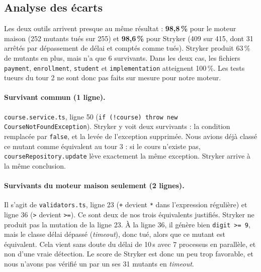 \documentclass[12pt,a4paper]{article}
\begin{document}
\subsection{Analyse des écarts}
Les deux outils arrivent presque au même résultat : \textbf{98{,}8\,\%} pour le moteur maison (252 mutants tués sur 255) et \textbf{98{,}6\,\%} pour Stryker (409 sur 415, dont 31 arrêtés par dépassement de délai et comptés comme tués). Stryker produit 63\,\% de mutants en plus, mais n'a que 6 survivants. Dans les deux cas, les fichiers \texttt{payment}, \texttt{enrollment}, \texttt{student} et \texttt{implementation} atteignent 100\,\%. Les tests tueurs du tour 2 ne sont donc pas faits sur mesure pour notre moteur.

\paragraph{Survivant commun (1 ligne).} \texttt{course.service.ts}, ligne 50 (\texttt{if (!course) throw new CourseNotFoundException}). Stryker y voit deux survivants : la condition remplacée par \texttt{false}, et la levée de l'exception supprimée. Nous avions déjà classé ce mutant comme équivalent au tour 3 : si le cours n'existe pas, \texttt{courseRepository.update} lève exactement la même exception. Stryker arrive à la même conclusion.

\paragraph{Survivants du moteur maison seulement (2 lignes).} Il s'agit de \texttt{validators.ts}, ligne 23 (\texttt{+} devient \texttt{*} dans l'expression régulière) et ligne 36 (\texttt{>} devient \texttt{>=}). Ce sont deux de nos trois équivalents justifiés. Stryker ne produit pas la mutation de la ligne 23. À la ligne 36, il génère bien \texttt{digit >= 9}, mais le classe \og délai dépassé \fg{} (\emph{timeout}), donc tué, alors que ce mutant est équivalent. Cela vient sans doute du délai de 10\,s avec 7 processus en parallèle, et non d'une vraie détection. Le score de Stryker est donc un peu trop favorable, et nous n'avons pas vérifié un par un ses 31 mutants en \emph{timeout}.
\end{document}
